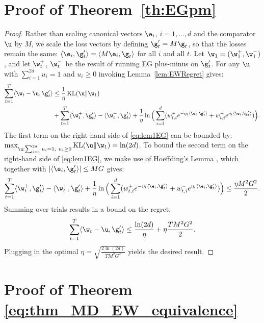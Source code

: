 \documentclass{colt2018} %
\DeclareMathOperator{\kl}{KL}
\newcommand{\inner}[2]{\langle #1, #2 \rangle}  %
\begin{document}
\section{Proof of Theorem~\ref{th:EGpm}}\label{sec:EGpmproof}

\begin{proof}
Rather than scaling canonical vectors $\e_i$, $i=1,\ldots,d$ and the comparator
$\u$ by $M$, we scale the
loss vectors by defining $\g_t' = M \g_t$, so that the losses remain the same:
$\inner{\e_i}{\g_t'} = \inner{M \e_i}{\g_t}$ for all $i$ and all $t$.
Let $\w_1 = (\w_1^+, \w_1^-)$, and let $\w_t^+$, $\w_t^-$ be the result of running EG plus-minus on $\g_t'$. For any $\u$ with $\sum_{i = 1}^{2d} u_i = 1$ and $u_i \geq 0$ invoking Lemma~\ref{lem:EWRegret} gives:
\begin{align}
  \sum_{t=1}^T\langle \w_t - \u, \g_t' \rangle  
  &\leq \frac{1}{\eta}\kl(\u\|\w_1) \nonumber  \\
  &+ \sum_{t=1}^T \langle \w_t^+, \g_t' \rangle - \langle \w_t^-, \g_t' \rangle
    + \frac{1}{\eta}\ln \Big(\sum_{i=1}^d (w_{t,i}^+ e^{-\eta_t \langle \e_i, \g_{t}' \rangle} + w_{t,i}^- e^{\eta_t
    \langle \e_i, \g_{t}' \rangle})\Big).
\label{eq:lem1EG}
\end{align}
The first term on the right-hand side of \eqref{eq:lem1EG} 
can be bounded by: $\max_{\u: \sum_{i = 1}^{2d} u_i = 1, ~u_i \geq 0}
\kl(\u\|\w_1) = \ln(2d)$. To bound the second term on the right-hand side of
\eqref{eq:lem1EG}, 
we make use of Hoeffding's Lemma \citep[Lemma A.1]{CesaBianchiLugosi2006}, 
which together with $|\inner{\e_i}{\g_t'}| \leq MG$ gives:
% 
% 
% 
% 
% 
% 
% 
% 
% 
% 
% 
% 
% 
\[
 \sum_{t=1}^T \langle \w_t^+, \g_t' \rangle - \langle \w_t^-, \g_t' \rangle +
 \frac{1}{\eta}\ln \Big(\sum_{i=1}^d (w_{t,i}^+ e^{-\eta_t \langle \e_i, \g_{t}' \rangle} + w_{t,i}^- e^{\eta_t
 \langle \e_i, \g_{t}' \rangle})\Big) \leq \frac{\eta M^2 G^2}{2}.
\]
% 
Summing over trials results in a bound on the regret:
% 
\[
\sum_{t=1}^T\langle \w_t - \u, \g_t' \rangle \leq \frac{\ln(2d)}{\eta} + \eta
\frac{T M^2G^2}{2}.
\]
% 
% 
Plugging in the optimal $\eta = \sqrt{\frac{2 \ln(2d)}{T M^2 G^2}}$ yields the desired result. 
\end{proof}

\section{Proof of Theorem \ref{eq:thm_MD_EW_equivalence}}
\label{sec:thm_MD_EW_equivalence}
\end{document}
